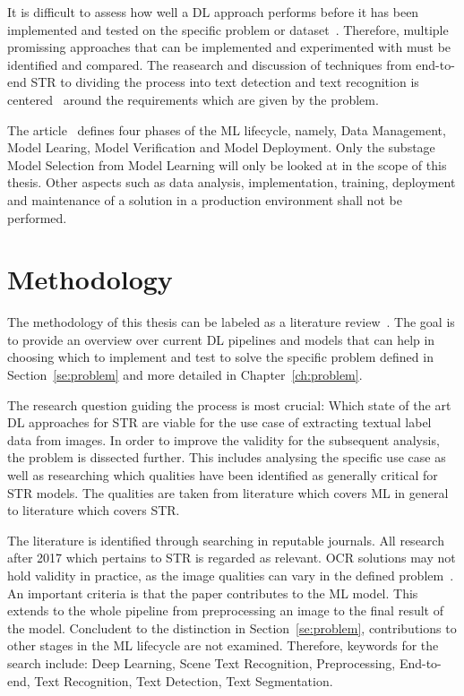It is difficult to assess how well a \ac{DL} approach performs before it has been
implemented and tested on the specific problem or dataset~\citep{arpteg_software_2018}.
Therefore, multiple promissing approaches that can be implemented and experimented with must
be identified and compared.
The reasearch and discussion of techniques from end-to-end \ac{STR} to dividing the
process into text detection and text recognition is centered~\cite{chen_text_2021} around the
requirements which are given by the problem.

The article~\cite{ashmore_assuring_2021} defines four phases of the \ac{ML} lifecycle, namely,
Data Management, Model Learing, Model Verification and Model Deployment.
Only the substage Model Selection from Model Learning will only be looked at in the scope of this
thesis.
Other aspects such as data analysis, implementation, training, deployment and maintenance of a
solution in a production environment shall not be performed.

\section{Methodology}\label{se:methodology}
The methodology of this thesis can be labeled as a literature review~\citep{snyder_literature_2019,
torraco_writing_2005}.
The goal is to provide an overview over current \ac{DL} pipelines and models that can help in
choosing which to implement and test to solve the specific problem defined in
Section~\ref{se:problem} and more detailed in Chapter~\ref{ch:problem}.

The research question guiding the process is most crucial: Which state of the art \ac{DL}
approaches for \ac{STR} are viable for the use case of extracting textual label data from
images.
In order to improve the validity for the subsequent analysis, the problem is dissected further.
This includes analysing the specific use case as well as researching which qualities have been
identified as generally critical for \ac{STR} models.
The qualities are taken from literature which covers \ac{ML} in general to literature
which covers \ac{STR}.

The literature is identified through searching in reputable journals.
All research after 2017 which pertains to \ac{STR} is regarded as relevant.
\ac{OCR} solutions may not hold validity in practice, as the image qualities can vary in the
defined problem~\citep{chen_text_2021}.
An important criteria is that the paper contributes to the \ac{ML} model.
This extends to the whole pipeline  from preprocessing an image to the final result of the model.
Concludent to the distinction in Section~\ref{se:problem}, contributions to other stages in the
\ac{ML} lifecycle are not examined.
Therefore, keywords for the search include: Deep Learning, Scene Text Recognition,
Preprocessing, End-to-end, Text Recognition, Text Detection, Text Segmentation.

